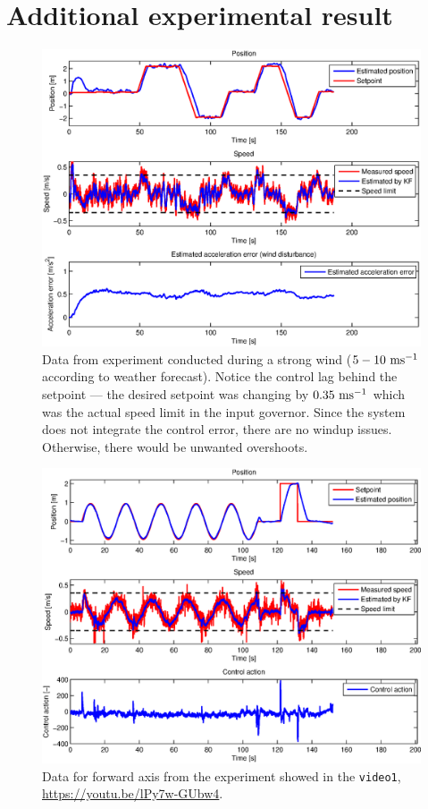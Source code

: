 \section{Additional experimental result}\label{ape:experiments}
\begin{figure}[H]
\centering
\begin{sideways}
\includegraphics[scale=0.99]{fig/experiment_vitr_venku.eps}
\end{sideways}
\caption*{Data from experiment conducted during a strong wind ($5 - 10~\mathrm{ms^{-1}}$ according to weather forecast). Notice the control lag behind the setpoint --- the desired setpoint was changing by $0.35~\mathrm{ms^{-1}}$ which was the actual speed limit in the input governor. Since the system does not integrate the control error, there are no windup issues. Otherwise, there would be unwanted overshoots.}
\end{figure}

\begin{figure}[H]
\centering
\begin{sideways}
\includegraphics[scale=0.99]{fig/trajectory_circle_apendix.eps}
\end{sideways}
\caption*{Data for forward axis from the experiment showed in the \texttt{video1}, \url{https://youtu.be/lPy7w-GUbw4}.}
\end{figure}

